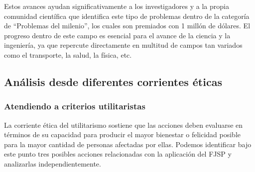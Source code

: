 Estos avances ayudan significativamente a los investigadores y a la propia comunidad científica 
que identifica este tipo de problemas dentro de la categoría de “Problemas del milenio”, los 
cuales son premiados con 1 millón de dólares. El progreso dentro de este campo es esencial para 
el avance de la ciencia y la ingeniería, ya que repercute directamente en multitud de campos tan 
variados como el transporte, la salud, la física, etc.

\subsection{Análisis desde diferentes corrientes éticas}
\subsubsection{Atendiendo a criterios utilitaristas}
La corriente ética del utilitarismo sostiene que las acciones deben evaluarse en 
términos de su capacidad para producir el mayor bienestar o felicidad posible para 
la mayor cantidad de personas afectadas por ellas. Podemos identificar bajo este punto 
tres posibles acciones relacionadas con la aplicación del FJSP y analizarlas independientemente.

